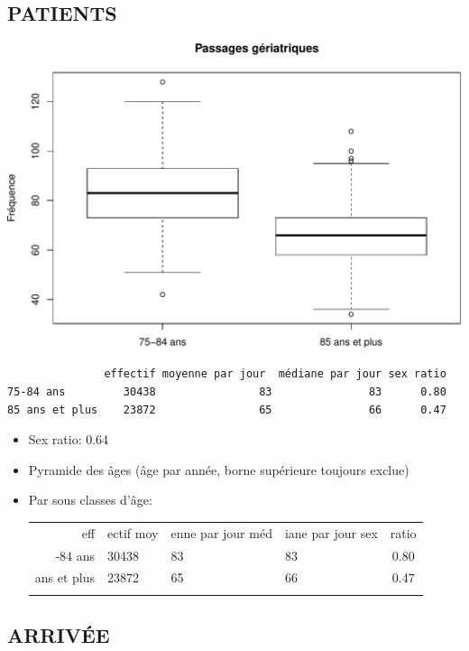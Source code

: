 \documentclass[]{article}
\begin{document}
\subsection{PATIENTS}\label{patients-2}

\includegraphics{rapport2014_V4_files/figure-latex/sexe75-1.pdf}

\begin{verbatim}
               effectif moyenne par jour  médiane par jour sex ratio
75-84 ans         30438                83               83      0.80
85 ans et plus    23872                65               66      0.47
\end{verbatim}

\begin{itemize}
\item
  Sex ratio: 0.64
\item
  Pyramide des âges (âge par année, borne supérieure toujours exclue)
\item
  Par sous classes d'âge:

  \begin{longtable}[c]{@{}rlllc@{}}
  \toprule\addlinespace
  eff & ectif moy & enne par jour méd & iane par jour sex & ratio
  \\\addlinespace
  \midrule\endhead
  75-84 ans & 30438 & 83 & 83 & 0.80
  \\\addlinespace
  85 ans et plus & 23872 & 65 & 66 & 0.47
  \\\addlinespace
  \bottomrule
  \end{longtable}
\end{itemize}

\subsection{ARRIVÉE}\label{arrivee-1}
\end{document}
